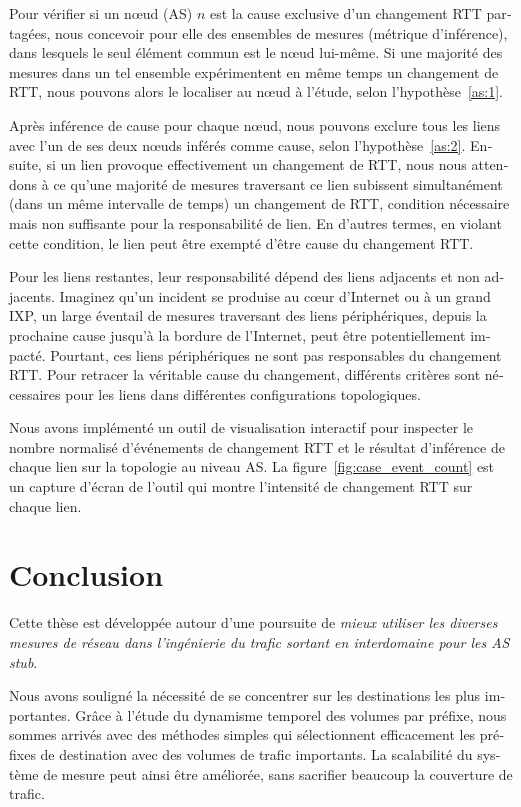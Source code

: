 \begin{otherlanguage}{french}
Pour vérifier si un nœud (AS) $n$ est la cause exclusive d'un changement RTT partagées, nous
concevoir pour elle des ensembles de mesures (métrique d'inférence), dans lesquels le seul élément commun est le nœud lui-même. 
Si une majorité des mesures dans un tel ensemble expérimentent en même temps un changement de RTT, nous pouvons alors le localiser au nœud à l'étude, selon l'hypothèse~\ref{as:1}.

Après inférence de cause pour chaque nœud, nous pouvons exclure tous les liens avec l'un de ses deux nœuds inférés comme cause, selon l'hypothèse~\ref{as:2}.
Ensuite, si un lien provoque effectivement un changement de RTT, nous nous attendons à ce qu'une majorité de mesures traversant ce lien subissent simultanément (dans un même intervalle de temps) un changement de RTT, 
condition nécessaire mais non suffisante pour la responsabilité de lien. 
En d'autres termes, en violant cette condition, le lien peut être exempté d'être cause du changement RTT.

Pour les liens restantes, leur responsabilité dépend des liens adjacents et non adjacents. 
Imaginez qu'un incident se produise au cœur d'Internet ou à un grand IXP, un large éventail de mesures traversant des liens périphériques, depuis la prochaine cause jusqu'à la bordure de l'Internet, peut être potentiellement impacté. 
Pourtant, ces liens périphériques ne sont pas responsables du changement RTT.
Pour retracer la véritable cause du changement, différents critères sont nécessaires pour les liens dans différentes configurations topologiques.

Nous avons implémenté un outil de visualisation interactif pour inspecter le nombre normalisé d'événements de changement RTT 
et le résultat d'inférence de chaque lien sur la topologie au niveau AS.
La figure~\ref{fig:case_event_count} est un capture d'écran de l'outil qui montre l'intensité de changement RTT sur chaque lien.

\section*{Conclusion}

Cette thèse est développée autour d'une poursuite de 
\textit{mieux utiliser les diverses mesures de réseau dans l'ingénierie du trafic sortant en interdomaine pour les AS stub}.

Nous avons souligné la nécessité de se concentrer sur les destinations les plus importantes.
Grâce à l'étude du dynamisme temporel des volumes par préfixe,
nous sommes arrivés avec des méthodes simples qui sélectionnent efficacement les préfixes de destination avec des volumes de trafic importants.
La scalabilité du système de mesure peut ainsi être améliorée, sans sacrifier beaucoup la couverture de trafic.


\end{otherlanguage}
